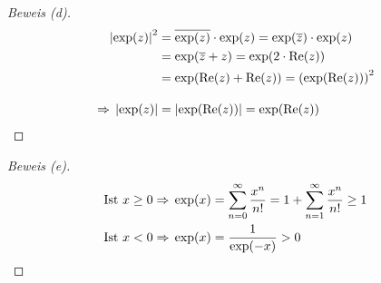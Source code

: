 \begin{satz}
\begin{proof}[Beweis (d)]
        \begin{align*}
            \left\lvert\exp(z)\right\rvert^2 &= \overline{\exp(z)}\cdot \exp(z) = \exp(\overline{z})\cdot \exp(z)\\
            &= \exp(\overline{z} + z) = \exp(2\cdot \operatorname{Re}(z))\\
            &=\exp(\operatorname{Re}(z)+ \operatorname{Re}(z)) = \left(\exp(\operatorname{Re}(z))\right)^2\\[10pt]
            \Rightarrow{} \left\lvert\exp(z)\right\rvert &= \left\lvert\exp(\operatorname{Re}(z))\right\rvert = \exp(\operatorname{Re}(z))\qedhere
        \end{align*}
    \end{proof}
    \begin{proof}[Beweis (e)]
        \begin{align*}
            \text{Ist } x \geq 0 &\Rightarrow{} \exp(x) = \sum_{n=0}^{\infty} \frac{x^n}{n!}= 1 + \sum_{n=1}^{\infty} \frac{x^n}{n!}\geq 1\\
            \text{Ist } x < 0 &\Rightarrow{} \exp(x) = \frac{1}{\exp(-x)} > 0\qedhere
        \end{align*}
    \end{proof}
\end{satz}

